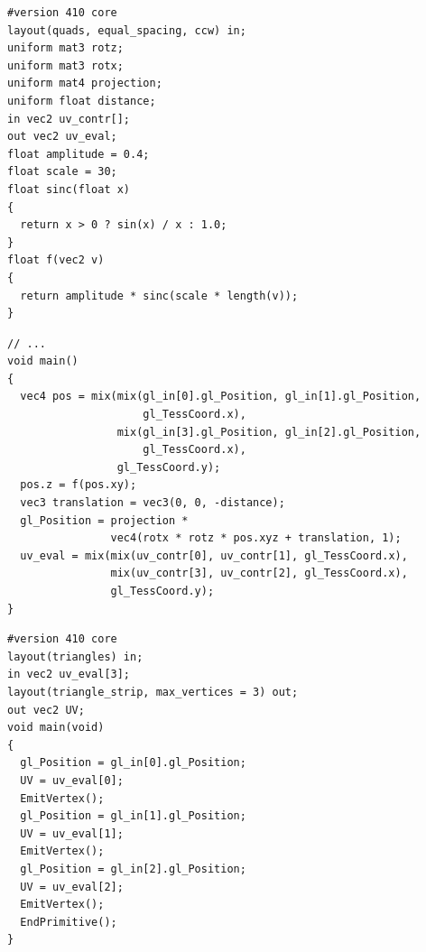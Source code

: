 \documentclass[calcdimensions,landscape,letterpaper]{powersem}
\newcommand{\thecurrentheading}{}
\newcommand{\heading}[1]{\renewcommand{\thecurrentheading}{#1}}
\begin{document}
\begin{slide}
    \heading{Tessellation: Tessellation Evaluation Shader}
    \begin{center}
        \begin{minipage}[c]{.95\textwidth}
            \begin{verbatim}
#version 410 core
layout(quads, equal_spacing, ccw) in;
uniform mat3 rotz;
uniform mat3 rotx;
uniform mat4 projection;
uniform float distance;
in vec2 uv_contr[];
out vec2 uv_eval;
float amplitude = 0.4;
float scale = 30;
float sinc(float x)
{
  return x > 0 ? sin(x) / x : 1.0;
}
float f(vec2 v)
{
  return amplitude * sinc(scale * length(v));
}
            \end{verbatim}
        \end{minipage}
    \end{center}
\end{slide}

\begin{slide}
    \heading{Tessellation: Tessellation Evaluation Shader}
    \begin{center}
        \begin{minipage}[c]{.95\textwidth}
            \begin{verbatim}
// ...
void main()
{
  vec4 pos = mix(mix(gl_in[0].gl_Position, gl_in[1].gl_Position,
                     gl_TessCoord.x),
                 mix(gl_in[3].gl_Position, gl_in[2].gl_Position,
                     gl_TessCoord.x),
                 gl_TessCoord.y);
  pos.z = f(pos.xy);
  vec3 translation = vec3(0, 0, -distance);
  gl_Position = projection *
                vec4(rotx * rotz * pos.xyz + translation, 1);
  uv_eval = mix(mix(uv_contr[0], uv_contr[1], gl_TessCoord.x),
                mix(uv_contr[3], uv_contr[2], gl_TessCoord.x),
                gl_TessCoord.y);
}
            \end{verbatim}
        \end{minipage}
    \end{center}
\end{slide}

\begin{slide}
    \heading{Tessellation: Geometry Shader}
    \begin{center}
        \begin{minipage}[c]{.95\textwidth}
            \begin{verbatim}
#version 410 core
layout(triangles) in;
in vec2 uv_eval[3];
layout(triangle_strip, max_vertices = 3) out;
out vec2 UV;
void main(void)
{
  gl_Position = gl_in[0].gl_Position;
  UV = uv_eval[0];
  EmitVertex();
  gl_Position = gl_in[1].gl_Position;
  UV = uv_eval[1];
  EmitVertex();
  gl_Position = gl_in[2].gl_Position;
  UV = uv_eval[2];
  EmitVertex();
  EndPrimitive();
}
            \end{verbatim}
        \end{minipage}
    \end{center}
\end{slide}
\end{document}
